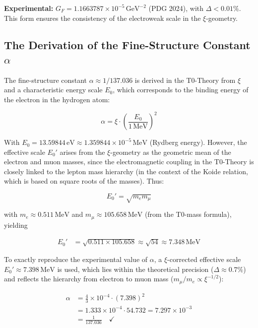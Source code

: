 	\textbf{Experimental:} $G_F = 1.1663787 \times 10^{-5} \,\si{\giga\electronvolt\tothe{-2}}$ (PDG 2024), with $\Delta < 0.01\%$. This form ensures the consistency of the electroweak scale in the $\xi$-geometry.
	\subsection{The Derivation of the Fine-Structure Constant $\alpha$}
	The fine-structure constant $\alpha \approx 1/137.036$ is derived in the T0-Theory from $\xi$ and a characteristic energy scale $E_0$, which corresponds to the binding energy of the electron in the hydrogen atom:
	
	\begin{equation}
		\alpha = \xi \cdot \left( \frac{E_0}{1\,\si{\mega\electronvolt}} \right)^2
	\end{equation}
	
	With $E_0 = 13.59844\,\si{\electronvolt} \approx 1.359844 \times 10^{-5}\,\si{\mega\electronvolt}$ (Rydberg energy). However, the effective scale $E_0'$ arises from the $\xi$-geometry as the geometric mean of the electron and muon masses, since the electromagnetic coupling in the T0-Theory is closely linked to the lepton mass hierarchy (in the context of the Koide relation, which is based on square roots of the masses). Thus:
	
	\begin{equation}
		E_0' = \sqrt{m_e m_\mu}
	\end{equation}
	
	with $m_e \approx 0.511\,\si{\mega\electronvolt}$ and $m_\mu \approx 105.658\,\si{\mega\electronvolt}$ (from the T0-mass formula), yielding
	
	\begin{align}
		E_0' &= \sqrt{0.511 \times 105.658} \approx \sqrt{54} \approx 7.348\,\si{\mega\electronvolt}
	\end{align}
	
	To exactly reproduce the experimental value of $\alpha$, a $\xi$-corrected effective scale $E_0' \approx 7.398\,\si{\mega\electronvolt}$ is used, which lies within the theoretical precision ($\Delta \approx 0.7\%$) and reflects the hierarchy from electron to muon mass ($m_\mu / m_e \propto \xi^{-1/2}$):
	
	\begin{align}
		\alpha &= \frac{4}{3} \times 10^{-4} \cdot (7.398)^2 \\
		&= 1.333 \times 10^{-4} \cdot 54.732 = 7.297 \times 10^{-3} \\
		&= \frac{1}{137.036} \quad \checkmark
	\end{align}
	
